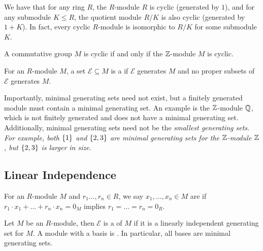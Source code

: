 \documentclass{styles/tufte}
\begin{document}
We have that for any ring $R$, the $R$-module $R$ is cyclic (generated by $1$), and for any submodule $K \leqslant R$, the quotient module $R/K$ is also cyclic (generated by $1 + K$). In fact, every cyclic $R$-module is isomorphic to $R/K$ for some submodule $K$.

\begin{proposition}{}{}
  A commutative group $M$ is cyclic if and only if the $\mathbb{Z}$-module $M$ is cyclic.
\end{proposition}

\begin{definition}{}{}
  For an $R$-module $M$, a set $\mathcal{E} \subseteq M$ is a  if $\mathcal{E}$ generates $M$ and no proper subsets of $\mathcal{E}$ generates $M$.
\end{definition}

Importantly, minimal generating sets need not exist, but a finitely generated module must contain a minimal generating set. An example is the $\mathbb{Z}$-module $\mathbb{Q}$, which is not finitely generated and does not have a minimal generating set. Additionally, minimal generating sets need not be the \em{smallest} generating sets. For example, both $\set{1}$ and $\set{2, 3}$ are minimal generating sets for the $\mathbb{Z}$-module $\mathbb{Z}$, but $\set{2, 3}$ is larger in size.


\subsection{Linear Independence}
  
  \begin{definition}{}{}
    For an $R$-module $M$ and $r_1 \dots, r_n \in R$, we say $x_1, \dots, x_n \in M$ are  if $r_1 \cdot x_1 + \dots + r_n \cdot x_n = 0_M$ implies $r_1 = \dots = r_n = 0_R$.
  \end{definition}
  
  \begin{definition}{}{}
    Let $M$ be an $R$-module, then $\mathcal{E}$ is a  of $M$ if it is a linearly independent generating set for $M$. A module with a basis is . In particular, all bases are minimal generating sets.
  \end{definition}
\end{document}
